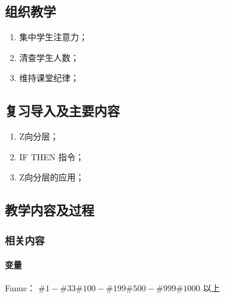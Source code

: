 \jxhj{%
	}

\makeshouye %

\subsection{组织教学}
\begin{enumerate}[\hspace{2em}1、]
	\item 集中学生注意力；
	\item 清查学生人数；
	\item 维持课堂纪律；
\end{enumerate}
\subsection{复习导入及主要内容}
\begin{enumerate}[\hspace{2em}1、]
\item Z向分层；
\item IF THEN 指令；
\item Z向分层的应用；
\end{enumerate}


\subsection{教学内容及过程}


\subsubsection{相关内容}
\paragraph{变量}
Fanuc： $\#1-\#33 \#100-\#199  \#500-\#999 \#1000$ 以上

